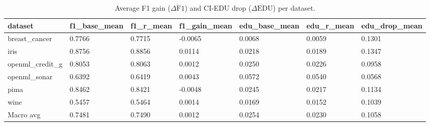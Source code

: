 \begin{table}
\caption{Average F1 gain ($\overline{\Delta \mathrm{F1}}$) and CI-EDU drop ($\overline{\Delta \mathrm{EDU}}$) per dataset.}
\label{tab:f1_gain_edu_drop}
\begin{tabular}{lllllll}
\toprule
dataset & f1\_base\_mean & f1\_r\_mean & f1\_gain\_mean & edu\_base\_mean & edu\_r\_mean & edu\_drop\_mean \\
\midrule
breast\_cancer & 0.7766 & 0.7715 & -0.0065 & 0.0068 & 0.0059 & 0.1301 \\
iris & 0.8756 & 0.8856 & 0.0114 & 0.0218 & 0.0189 & 0.1347 \\
openml\_credit\_g & 0.8053 & 0.8063 & 0.0012 & 0.0250 & 0.0226 & 0.0958 \\
openml\_sonar & 0.6392 & 0.6419 & 0.0043 & 0.0572 & 0.0540 & 0.0568 \\
pima & 0.8462 & 0.8421 & -0.0048 & 0.0245 & 0.0217 & 0.1134 \\
wine & 0.5457 & 0.5464 & 0.0014 & 0.0169 & 0.0152 & 0.1039 \\
Macro avg & 0.7481 & 0.7490 & 0.0012 & 0.0254 & 0.0230 & 0.1058 \\
\bottomrule
\end{tabular}
\end{table}
